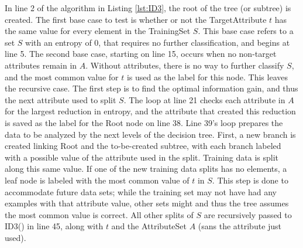 In line 2 of the algorithm in Listing \ref{lst:ID3}, the root of the tree (or subtree) is created. The first base case to test is whether or not the TargetAttribute $t$ has the same value for every element in the TrainingSet $S$. This base case refers to a set $S$ with an entropy of 0, that requires no further classification, and begins at line 5. The second base case, starting on line 15, occurs when no non-target attributes remain in $A$. Without attributes, there is no way to further classify $S$, and the most common value for $t$ is used as the label for this node. This leaves the recursive case. The first step is to find the optimal information gain, and thus the next attribute used to split $S$. The loop at line 21 checks each attribute in $A$ for the largest reduction in entropy, and the attribute that created this reduction is saved as the label for the Root node on line 38. Line 39's loop prepares the data to be analyzed by the next levels of the decision tree. First, a new branch is created linking Root and the to-be-created subtree, with each branch labeled with a possible value of the attribute used in the split. Training data is split along this same value. If one of the new training data splits has no elements, a leaf node is labeled with the most common value of $t$ in $S$. This step is done to accommodate future data sets; while the training set may not have had any examples with that attribute value, other sets might and thus the tree assumes the most common value is correct. All other splits of $S$ are recursively passed to ID3() in line 45, along with $t$ and the AttributeSet $A$ (sans the attribute just used).\\

